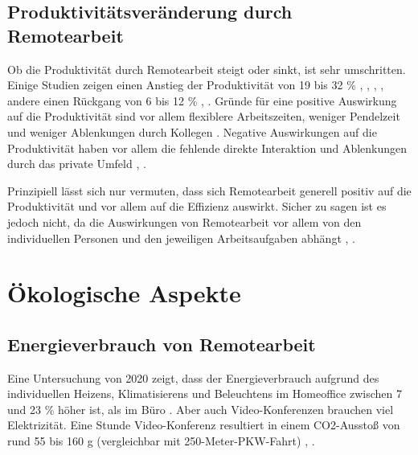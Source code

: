 \documentclass[runningheads]{llncs}
\begin{document}
\subsection{Produktivitätsveränderung durch Remotearbeit}

Ob die Produktivität durch Remotearbeit steigt oder sinkt, ist sehr umschritten.
Einige Studien zeigen einen Anstieg der Produktivität von 19 bis 32 \% \cite{capgemini_research_institute_future_2020}, \cite{glenn_dutcher_effects_2012}, \cite{owl_labs_state_2022}, \cite{global_workplace_analytics_latest_2021}, andere einen Rückgang von 6 bis 12 \% \cite{emanuel_working_2023}, \cite{steven_j_davis_evolution_2023}.
Gründe für eine positive Auswirkung auf die Produktivität sind vor allem flexiblere Arbeitszeiten, weniger Pendelzeit und weniger Ablenkungen durch Kollegen \cite{capgemini_research_institute_future_2020}.
Negative Auswirkungen auf die Produktivität haben vor allem die fehlende direkte Interaktion und Ablenkungen durch das private Umfeld \cite{holand_homeoffice_2023}, \cite{emanuel_working_2023}.

Prinzipiell lässt sich nur vermuten, dass sich Remotearbeit generell positiv auf die Produktivität und vor allem auf die Effizienz auswirkt.
Sicher zu sagen ist es jedoch nicht, da die Auswirkungen von Remotearbeit vor allem von den individuellen Personen und den jeweiligen Arbeitsaufgaben abhängt \cite{glenn_dutcher_effects_2012}, \cite{holand_homeoffice_2023}.

\section{Ökologische Aspekte}


\subsection{Energieverbrauch von Remotearbeit}

Eine Untersuchung von 2020 zeigt, dass der Energieverbrauch aufgrund des individuellen Heizens, Klimatisierens und Beleuchtens im Homeoffice zwischen 7 und 23 \% höher ist, als im Büro \cite{daniel_crow_working_2022}.
Aber auch Video-Konferenzen brauchen viel Elektrizität. 
Eine Stunde Video-Konferenz resultiert in einem CO2-Ausstoß von rund 55 bis 160 g (vergleichbar mit 250-Meter-PKW-Fahrt) \cite{deutschlandfunk_nova_internet-konferenz_2021}, \cite{eisemann_treibhauseffekt_2021}.
\end{document}
